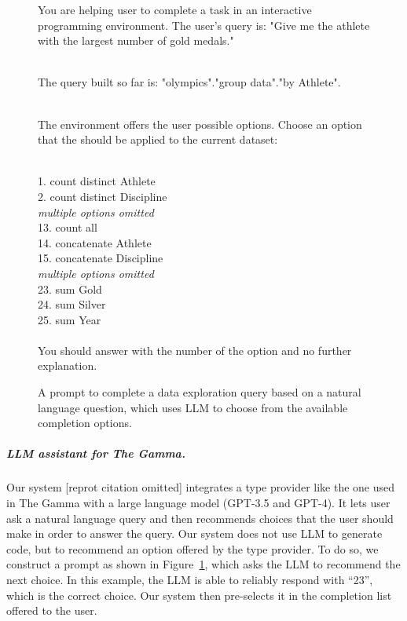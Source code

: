 \documentclass[a4paper,UKenglish,cleveref, autoref, thm-restate]{lipics-v2021}
\begin{document}
\begin{figure}
{\raggedright\ttfamily\small
You are helping user to complete a task in an interactive programming environment. The user's
query is: "Give me the athlete with the largest number of gold medals."

~\\[-0.75em]

The query built so far is: "olympics"."group data"."by Athlete".

~\\[-0.75em]

The environment offers the user possible options. Choose an option that the should be applied to the current dataset:

~\\[-0.75em]

1.\hspace{0.4em} count distinct Athlete\\
2.\hspace{0.4em} count distinct Discipline\\
\hspace{2.3em}\lbrack\textit{multiple options omitted}\rbrack \\
13. count all\\
14. concatenate Athlete\\
15. concatenate Discipline\\
\hspace{2.3em}\lbrack\textit{multiple options omitted}\rbrack\\
23. sum Gold\\
24. sum Silver\\
25. sum Year\\

~\\[-0.75em]

You should answer with the number of the option and no further explanation.}
\caption{A prompt to complete a data exploration query based on a natural language
question, which uses LLM to choose from the available completion options.}
\label{fig:llm}
\end{figure}


\subparagraph{LLM assistant for The Gamma.}
Our system [reprot citation omitted] integrates a type provider like the one used in The Gamma
with a large language model (GPT-3.5 and GPT-4). It lets user ask a natural language query and
then recommends choices that the user should make in order to answer the query. Our system does
not use LLM to generate code, but to recommend an option offered by the type provider. To do so,
we construct a prompt as shown in Figure~\ref{fig:llm}, which asks the LLM to recommend the next
choice. In this example, the LLM is able to reliably respond with ``23'', which is the correct
choice. Our system then pre-selects it in the completion list offered to the user.
\end{document}

